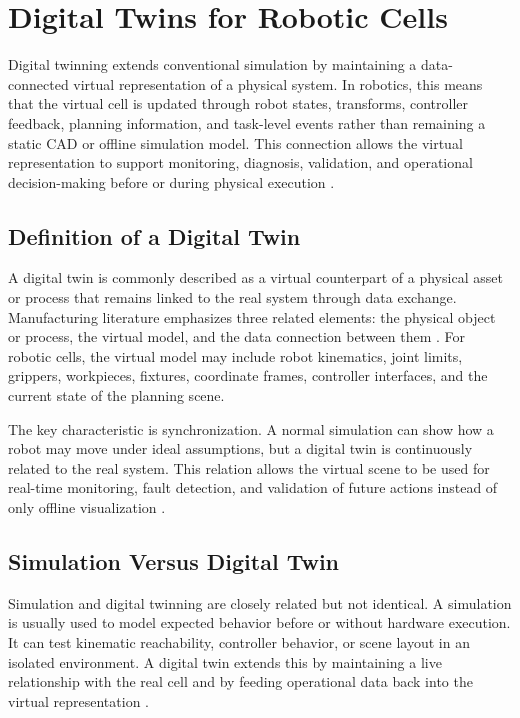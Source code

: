 \section{Digital Twins for Robotic Cells}

Digital twinning extends conventional simulation by maintaining a data-connected virtual representation of a physical system. In robotics, this means that the virtual cell is updated through robot states, transforms, controller feedback, planning information, and task-level events rather than remaining a static CAD or offline simulation model. This connection allows the virtual representation to support monitoring, diagnosis, validation, and operational decision-making before or during physical execution \cite{glaessgen2012digital,wang2017collaborative,kritzinger2018digital}.

\subsection{Definition of a Digital Twin}

A digital twin is commonly described as a virtual counterpart of a physical asset or process that remains linked to the real system through data exchange. Manufacturing literature emphasizes three related elements: the physical object or process, the virtual model, and the data connection between them \cite{kritzinger2018digital,tao2018digital}. For robotic cells, the virtual model may include robot kinematics, joint limits, grippers, workpieces, fixtures, coordinate frames, controller interfaces, and the current state of the planning scene.

The key characteristic is synchronization. A normal simulation can show how a robot may move under ideal assumptions, but a digital twin is continuously related to the real system. This relation allows the virtual scene to be used for real-time monitoring, fault detection, and validation of future actions instead of only offline visualization \cite{glaessgen2012digital,wang2017collaborative}.

\subsection{Simulation Versus Digital Twin}

Simulation and digital twinning are closely related but not identical. A simulation is usually used to model expected behavior before or without hardware execution. It can test kinematic reachability, controller behavior, or scene layout in an isolated environment. A digital twin extends this by maintaining a live relationship with the real cell and by feeding operational data back into the virtual representation \cite{kritzinger2018digital}.

